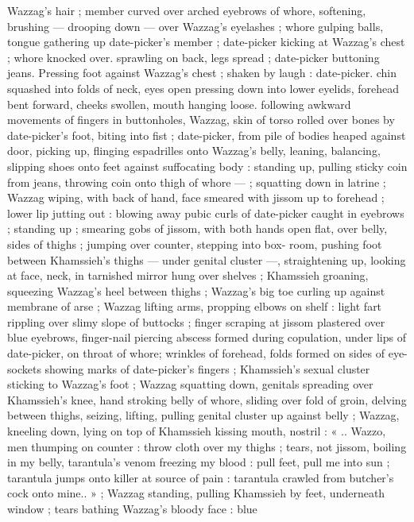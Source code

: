 Wazzag's hair ; member curved over arched eyebrows of whore,
softening, brushing --- drooping down --- over Wazzag's eyelashes
; whore gulping balls, tongue gathering up date-picker's member ;
date-picker kicking at Wazzag's chest ; whore knocked over.
sprawling on back, legs spread ; date-picker buttoning jeans.
Pressing foot against Wazzag’s chest ; shaken by laugh : date-picker.
chin squashed into folds of neck, eyes open pressing down into
lower eyelids, forehead bent forward, cheeks swollen, mouth hanging
loose. following awkward movements of fingers in buttonholes,
Wazzag, skin of torso rolled over bones by date-picker's foot, biting
into fist ; date-picker, from pile of bodies heaped against door,
picking up, flinging espadrilles onto Wazzag's belly, leaning,
balancing, slipping shoes onto feet against suffocating body :
standing up, pulling sticky coin from jeans, throwing coin onto thigh
of whore --- ; squatting down in latrine ; Wazzag wiping, with back of
hand, face smeared with jissom up to forehead ; lower lip jutting out
: blowing away pubic curls of date-picker caught in eyebrows ;
standing up ; smearing gobs of jissom, with both hands open flat,
over belly, sides of thighs ; jumping over counter, stepping into box-
room, pushing foot between Khamssieh’s thighs --- under genital
cluster ---, straightening up, looking at face, neck, in tarnished
mirror hung over shelves ; Khamssieh groaning, squeezing Wazzag's
heel between thighs ; Wazzag's big toe curling up against membrane
of arse ; Wazzag lifting arms, propping elbows on shelf : light fart
rippling over slimy slope of buttocks ; finger scraping at jissom
plastered over blue eyebrows, finger-nail piercing abscess formed
during copulation, under lips of date-picker, on throat of whore;
wrinkles of forehead, folds formed on sides of eye-sockets showing
marks of date-picker's fingers ; Khamssieh’s sexual cluster sticking
to Wazzag’s foot ; Wazzag squatting down, genitals spreading over
Khamssieh's knee, hand stroking belly of whore, sliding over fold of
groin, delving between thighs, seizing, lifting, pulling genital cluster
up against belly ; Wazzag, kneeling down, lying on top of Khamssieh
kissing mouth, nostril : « .. Wazzo, men thumping on counter : throw
cloth over my thighs ; tears, not jissom, boiling in my belly,
tarantula's venom freezing my blood : pull feet, pull me into sun ;
tarantula jumps onto killer at source of pain : tarantula crawled from
butcher's cock onto mine.. » ; Wazzag standing, pulling Khamssieh by
feet, underneath window ; tears bathing Wazzag’s bloody face : blue
